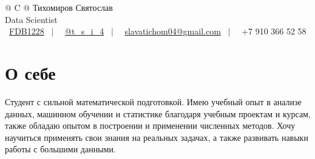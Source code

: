 \documentclass[a4paper,11pt]{article}
\begin{document}
	\pagestyle{empty}
	
	\begin{tabularx}{\linewidth}{@{} C @{}}
		\huge{Тихомиров Святослав} \\[4pt]
		\Large{Data Scientist} \\[4pt]
		\faGithub\ \href{https://github.com/FDB1228}{FDB1228} \ $|$ \
		\faTelegram\ \href{https://t.me/t_s_i_4}{@t\_s\_i\_4} \ $|$ \
		\faEnvelope\ \href{mailto:slavatichom04@gmail.com}{slavatichom04@gmail.com} \ $|$ \
		\faMobile\ +7 910 366 52 58 \\
	\end{tabularx}
	
	\section{О себе}
	Студент с сильной математической подготовкой. Имею учебный опыт в анализе данных,
	машинном обучении и статистике благодаря учебным проектам и курсам, также обладаю
	опытом в построении и применении численных методов.
	Хочу научиться применять свои знания на реальных задачах, а также развивать навыки
	работы с большими данными.
	
	
\end{document}
